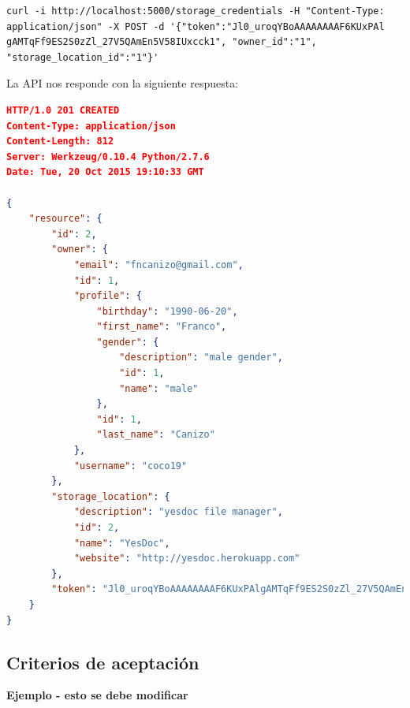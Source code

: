 \documentclass[a4paper,12pt]{article}
\begin{document}
\begin{verbatim}
curl -i http://localhost:5000/storage_credentials -H "Content-Type: 
application/json" -X POST -d '{"token":"Jl0_uroqYBoAAAAAAAAF6KUxPAl
gAMTqFf9ES2S0zZl_27V5QAmEn5V58IUxcck1", "owner_id":"1", 
"storage_location_id":"1"}'
\end{verbatim}

La API nos responde con la siguiente respuesta:

\begin{lstlisting}[language=json]
HTTP/1.0 201 CREATED
Content-Type: application/json
Content-Length: 812
Server: Werkzeug/0.10.4 Python/2.7.6
Date: Tue, 20 Oct 2015 19:10:33 GMT

{
    "resource": {
        "id": 2, 
        "owner": {
            "email": "fncanizo@gmail.com", 
            "id": 1, 
            "profile": {
                "birthday": "1990-06-20", 
                "first_name": "Franco", 
                "gender": {
                    "description": "male gender", 
                    "id": 1, 
                    "name": "male"
                }, 
                "id": 1, 
                "last_name": "Canizo"
            }, 
            "username": "coco19"
        }, 
        "storage_location": {
            "description": "yesdoc file manager", 
            "id": 2, 
            "name": "YesDoc", 
            "website": "http://yesdoc.herokuapp.com"
        }, 
        "token": "Jl0_uroqYBoAAAAAAAAF6KUxPAlgAMTqFf9ES2S0zZl_27V5QAmEn5V58IUxcck1"
    }
}
\end{lstlisting}




\subsection{Criterios de aceptación}
\textbf{Ejemplo - esto se debe modificar}
\end{document}
